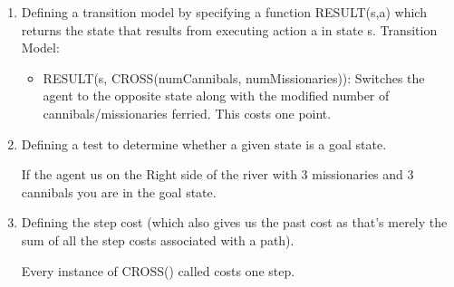 \documentclass[12pt]{article}
\begin{document}
\begin{enumerate}
\begin{enumerate}
    \item Defining a transition model by specifying a function RESULT(s,a) which returns the state that results from executing action a in state s.
    Transition Model:
      \begin{itemize}
        \item RESULT(s, CROSS(numCannibals, numMissionaries)): Switches the agent to the opposite state along with the modified number of cannibals/missionaries ferried.  This costs one point. 
      \end{itemize}
    \item Defining a test to determine whether a given state is a goal state.\par
    If the agent us on the Right side of the river with 3 missionaries and 3 cannibals you are in the goal state.

    \item Defining the step cost (which also gives us the past cost as that's merely the sum of all the step costs associated with a path).\par
    Every instance of CROSS() called costs one step.
  \end{enumerate}


\end{enumerate}
\end{document}

